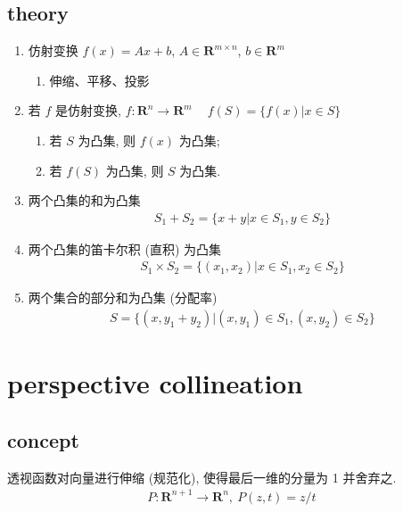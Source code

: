 \documentclass[oneside, 12pt]{ctexbook}
\begin{document}
			\subsection{\quad theory}
				\begin{enumerate}
					\item 仿射变换 $f(x) = Ax + b$, $A \in \boldsymbol{\text{R}}^{m \times n}$, $b \in \boldsymbol{\text{R}}^m$
						\begin{enumerate}
							\item 伸缩、平移、投影
						\end{enumerate}
					
					\item 若 $f$ 是仿射变换, $f : \boldsymbol{\text{R}}^n \rightarrow \boldsymbol{\text{R}}^m \ \quad f(S) = \{ f(x) | x \in S \}$
						\begin{enumerate}
							\item 若 $S$ 为凸集, 则 $f(x)$ 为凸集;
							
							\item 若 $f(S)$ 为凸集, 则 $S$ 为凸集. 
						\end{enumerate}
					
					\item 两个凸集的和为凸集
						\begin{align}
							S_1 + S_2 = \{ x + y | x \in S_1, y \in S_2 \}
						\end{align}
						
					\item 两个凸集的笛卡尔积 (直积) 为凸集
						\begin{align}
							S_1 \times S_2 = \{ (x_1, x_2) | x \in S_1, x_2 \in S_2 \}
						\end{align}
						
					\item 两个集合的部分和为凸集 (分配率)
						\begin{align}
							S = \{ (x, y_1 + y_2) | (x, y_1) \in S_1, (x, y_2) \in S_2 \}
						\end{align}
				\end{enumerate}
			
		\section{\quad perspective collineation}
			\subsection{\quad concept}
				透视函数对向量进行伸缩 (规范化), 使得最后一维的分量为 1 并舍弃之.
					\begin{align}
						P : \boldsymbol{\text{R}}^{n+1} \rightarrow \boldsymbol{\text{R}}^{n}, \ P(z, t) = z/t
					\end{align}
			
\end{document}
